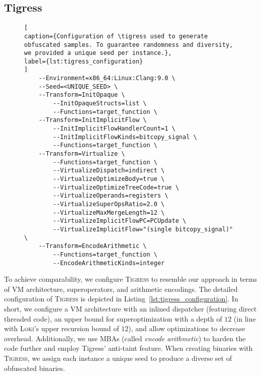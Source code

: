 \documentclass[letterpaper,twocolumn,10pt]{article}
\theoremstyle{customexample}
\theoremstyle{customexperiment}
\newcommand{\loki}{\textsc{Loki}\xspace}
\newcommand{\tigress}{\textsc{Tigress}\xspace}
\begin{document}
\subsection{Tigress}\label{sec:appendix:tigress}


\begin{figure}[htb]
\begin{lstlisting}[
caption={Configuration of \tigress used to generate obfuscated samples. To guarantee randomness and diversity, we provided a unique seed per instance.},
label={lst:tigress_configuration}
]
    --Environment=x86_64:Linux:Clang:9.0 \
    --Seed=<UNIQUE_SEED> \
    --Transform=InitOpaque \
        --InitOpaqueStructs=list \
        --Functions=target_function \
    --Transform=InitImplicitFlow \
        --InitImplicitFlowHandlerCount=1 \
        --InitImplicitFlowKinds=bitcopy_signal \
        --Functions=target_function \
    --Transform=Virtualize \
        --Functions=target_function \
        --VirtualizeDispatch=indirect \
        --VirtualizeOptimizeBody=true \
        --VirtualizeOptimizeTreeCode=true \
        --VirtualizeOperands=registers \
        --VirtualizeSuperOpsRatio=2.0 \
        --VirtualizeMaxMergeLength=12 \
        --VirtualizeImplicitFlowPC=PCUpdate \
        --VirtualizeImplicitFlow="(single bitcopy_signal)" \
    --Transform=EncodeArithmetic \
        --Functions=target_function \
        --EncodeArithmeticKinds=integer
\end{lstlisting}
\end{figure}

To achieve comparability, we configure \tigress to resemble our approach in terms of VM architecture, superoperators, and arithmetic encodings. The detailed configuration of \tigress is depicted in Listing~\ref{lst:tigress_configuration}. In short, we configure a VM architecture with an inlined dispatcher (featuring direct threaded code), an upper bound for superoptimization with a depth of $12$ (in line with \loki's upper recursion bound of $12$), and allow optimizations to decrease overhead. Additionally, we use MBAs (called \emph{encode arithmetic}) to harden the code further and employ Tigress' anti-taint feature. When creating binaries with \tigress, we assign each instance a unique seed to produce a diverse set of obfuscated binaries.
\end{document}
